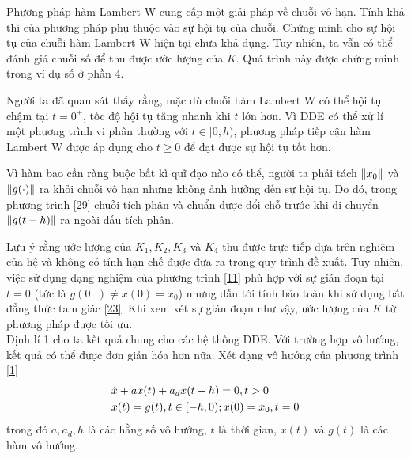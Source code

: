 \begin{nx}
	Phương pháp hàm Lambert W cung cấp một giải pháp về chuỗi vô hạn. Tính khả thi của phương pháp phụ thuộc vào sự hội tụ của chuỗi. Chứng minh cho sự hội tụ của chuỗi hàm Lambert W hiện tại chưa khả dụng. Tuy nhiên, ta vẫn có thể đánh giá chuỗi số để thu được ước lượng của $K$. Quá trình này được chứng minh trong ví dụ số ở phần 4. 
\end{nx}
\begin{nx}
	Người ta đã quan sát thấy rằng, mặc dù chuỗi hàm Lambert W có thể hội tụ chậm tại $t = 0^+$, tốc độ hội tụ tăng nhanh khi $t$ lớn hơn. Vì DDE có thể xử lí một phương trình vi phân thường với $t \in[0,h)$, phương pháp tiếp cận hàm Lambert W được áp dụng cho $t \ge 0$ để đạt được sự hội tụ tốt hơn. 
\end{nx}
\begin{nx}
	Vì hàm bao cần ràng buộc bất kì quĩ đạo nào có thể, người ta phải tách $\Vert x_0\Vert$ và $\Vert g(\cdot)\Vert$ ra khỏi chuỗi vô hạn nhưng không ảnh hưởng đến sự hội tụ. Do đó, trong phương trình \eqref{29} chuỗi tích phân và chuẩn được đổi chỗ trước khi di chuyển $\Vert g(t-h)\Vert$ ra ngoài dấu tích phân.
\end{nx}
\begin{nx}
	Lưu ý rằng ước lượng của $K_1, K_2, K_3$ và $K_4$ thu được trực tiếp dựa trên nghiệm của hệ và không có tính hạn chế  được đưa ra trong quy trình đề xuất. Tuy nhiên, việc sử dụng dạng nghiệm của phương trình \eqref{11} phù hợp với sự gián đoạn tại $t = 0$ (tức là $g(0^-) \ne x(0) =x_0$)  nhưng dẫn tới tính bảo toàn khi sử dụng bất đẳng thức tam giác \eqref{23}.  Khi xem xét sự gián đoạn như vậy, ước lượng của $K$ từ phương pháp được tối ưu.\\
	Định lí 1 cho ta kết quả chung cho các hệ thống DDE. Với trường hợp vô hướng, kết quả có thể được đơn giản hóa hơn nữa. Xét dạng vô hướng của phương trình \eqref{1}
	\begin{align}\label{30}
		&\dot{x} + ax(t) +a_dx(t-h)=0, t > 0 \notag\\ 
		&x(t) = g(t), t \in [-h, 0); x(0) = x_0 , t = 0
	\end{align}
trong đó $a, a_d, h$ là các hằng số vô hướng, $t$ là thời gian, $x(t)$ và $g(t)$ là các hàm vô hướng.
\end{nx}
